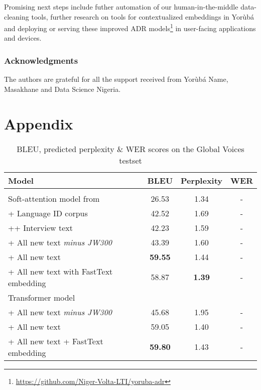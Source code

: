 \documentclass{article} %
\begin{document}
Promising next steps include futher automation of our human-in-the-middle data-cleaning tools, further research on tools for contextualized embeddings in Yor{\`u}b{\'a} and deploying or serving these improved ADR models\footnote{\url{https://github.com/Niger-Volta-LTI/yoruba-adr}} in user-facing applications and devices.  

\subsubsection*{Acknowledgments}
The authors are grateful for all the support received from Yor{\`u}b{\'a} Name, Masakhane and Data Science Nigeria. 




\clearpage

\appendix
\section{Appendix}\label{sec:appendix}

 \begin{table}[h]
  \caption{BLEU, predicted perplexity \& WER scores on the Global Voices testset}
  \label{tab:results-appendix}
 \begin{center}
  \begin{tabular}{lccc}
    \toprule
    \textbf{Model} & \textbf{BLEU} &\textbf{Perplexity} &\textbf{WER}\\
    \bottomrule
    \\
    Soft-attention model from \citep{orife2018adr} & 26.53 & 1.34 & -\\
    \midrule
	\hspace{5mm} + Language ID corpus & 42.52 & 1.69 & -\\ 
	\hspace{10mm} ++ Interview text & 42.23 & 1.59 & -\\
	\hspace{5mm} + All new text \it{minus} JW300 & 43.39 & 1.60 & -\\ 
	\hspace{5mm} + All new text & \textbf{59.55} & 1.44 & -\\ 
	\hspace{5mm} + All new text with FastText embedding & 58.87 & \textbf{1.39} & -\\ 
    \midrule
	Transformer model \\
	 \hspace{5mm} + All new text \it{minus} JW300 & 45.68 & 1.95 & -\\
	 \hspace{5mm} + All new text & 59.05 & 1.40 & -\\
	 \hspace{5mm} + All new text + FastText embedding & \textbf{59.80} & 1.43 & -\\ 
    \bottomrule
  \end{tabular}
  \end{center}
\end{table}
\end{document}
